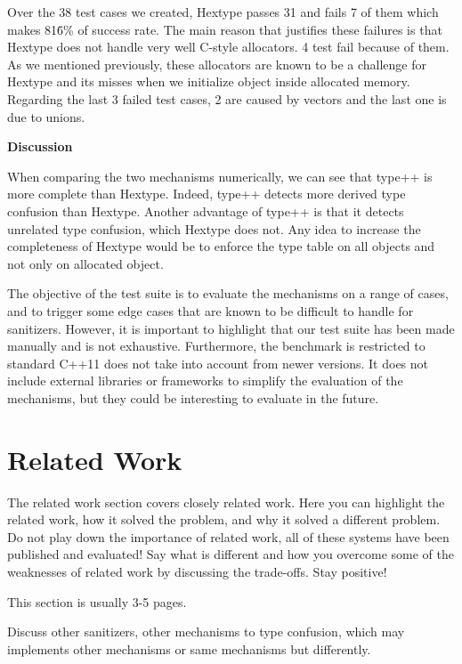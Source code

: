 \documentclass[a4paper,11pt,oneside]{report}
\begin{document}
\noindent{}Over the 38 test cases we created, Hextype passes 31 and 
fails 7 of them which makes 81\.6\% of success rate.
The main reason that justifies these failures is that Hextype does not handle very well
C-style allocators. 4 test fail because of them. As we mentioned previously, these allocators
are known to be a challenge for Hextype and its misses when we initialize object inside allocated memory. 
Regarding the last 3 failed test cases, 2 are caused by vectors and the last one is due to unions. 

\textbf{Discussion}

\noindent{}When comparing the two mechanisms numerically, we can see that type++ is more complete than Hextype.
Indeed, type++ detects more derived type confusion than Hextype. Another advantage of type++ is that it
detects unrelated type confusion, which Hextype does not. Any idea to increase the completeness of Hextype would be 
to enforce the type table on all objects and not only on allocated object.  

The objective of the test suite is to evaluate the mechanisms on a range of cases, and to trigger 
some edge cases that are known to be difficult to handle for sanitizers. However, it is important to highlight 
that our test suite has been made manually and is not exhaustive. Furthermore, the benchmark is restricted to
standard C++11 does not take into account from newer versions. It does not include external libraries or frameworks
to simplify the evaluation of the mechanisms, but they could be interesting to evaluate in the future.


\chapter{Related Work}

The related work section covers closely related work. Here you can highlight
the related work, how it solved the problem, and why it solved a different
problem. Do not play down the importance of related work, all of these
systems have been published and evaluated! Say what is different and how
you overcome some of the weaknesses of related work by discussing the 
trade-offs. Stay positive!

This section is usually 3-5 pages.

Discuss other sanitizers, other mechanisms to type confusion,
which may implements other mechanisms or same mechanisms but differently.
\end{document}
